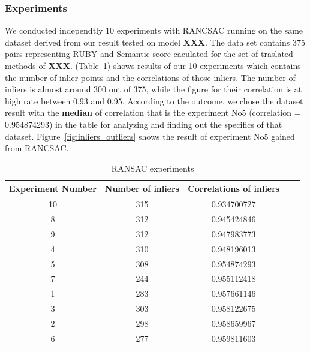 \subsubsection{Experiments}
We conducted independtly 10 experiments with RANCSAC running on the same dataset derived from our result tested on model \textbf{XXX}. The data set contains 375 pairs representing RUBY and Semantic score caculated for the set of traslated methods of \textbf{XXX}. (Table~\ref{table:RANSAC_experiments}) shows results of our 10 experiments which contains the number of inlier points and the correlations of those inliers. The number of inliers is almost around 300 out of 375, while the figure for their correlation is at high rate between 0.93 and 0.95. 
According to the outcome, we chose the dataset result with the \textbf{median} of correlation that is the experiment No5 (correlation = 0.954874293) in the table for analyzing and finding out the specifics of that dataset. Figure~\ref{fig:inliers_outliers} shows the result of experiment No5 gained from RANCSAC.
\begin{table}
	\caption{RANSAC experiments}
	\begin{tabular}{|c|c|c|c|c|}
		\hline
		Experiment Number & Number of inliers & Correlations of inliers \\
		\hline
		10	& 315	& 0.934700727 \\		
		8	& 312	& 0.945424846 \\	
		9	& 312	& 0.947983773 \\
		4	& 310	& 0.948196013 \\
		{\cellcolor[gray]{.8}}5	& {\cellcolor[gray]{.8}}308	& {\cellcolor[gray]{.8}}0.954874293 \\
		7	& 244	& 0.955112418 \\	
		1	& 283	& 0.957661146 \\
		3	& 303	& 0.958122675 \\
		2	& 298	& 0.958659967 \\
		6	& 277	& 0.959811603 \\		
		\hline
	\end{tabular}
	\label{table:RANSAC_experiments}
\end{table}


